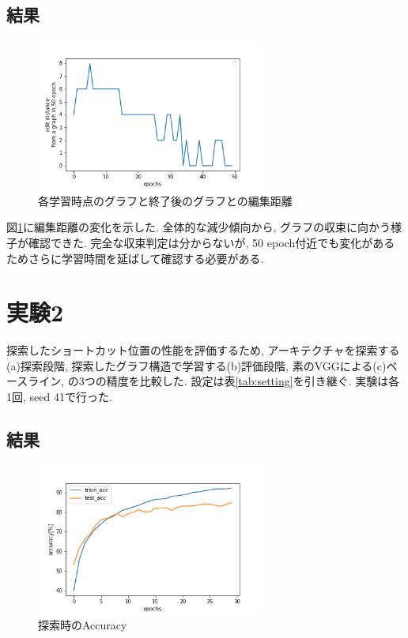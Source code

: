 \documentclass[twocolumn]{jarticle}     %
\begin{document}
\subsection{結果}

\begin{figure}[tb]
	\begin{center}
		\includegraphics[clip,width=75mm]{graph.png}
		\caption{各学習時点のグラフと終了後のグラフとの編集距離}
		\label{fig:edit}
	\end{center}
\end{figure}

図\ref{fig:edit}に編集距離の変化を示した.
全体的な減少傾向から, グラフの収束に向かう様子が確認できた.
完全な収束判定は分からないが, 50 epoch付近でも変化があるためさらに学習時間を延ばして確認する必要がある.

\section{実験2}

探索したショートカット位置の性能を評価するため, アーキテクチャを探索する(a)探索段階, 探索したグラフ構造で学習する(b)評価段階, 素のVGGによる(c)ベースライン, の3つの精度を比較した.
設定は表\ref{tab:setting}を引き継ぐ.
実験は各1回, seed 41で行った.

\subsection{結果}

\begin{figure}[tb]
	\begin{center}
		\includegraphics[clip,width=75mm]{search_acc.png}
		\caption{探索時のAccuracy}
		\label{fig:search_acc}
	\end{center}
\end{figure}
\end{document}
